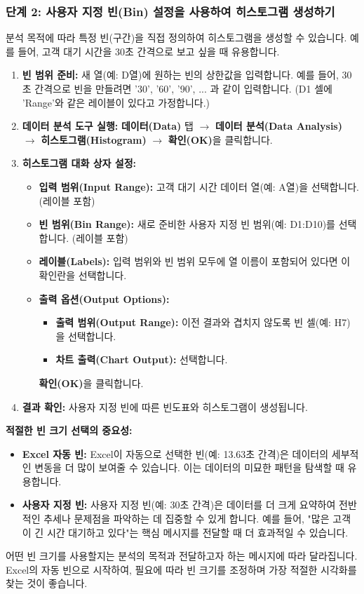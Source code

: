\documentclass[11pt,a4paper]{book}
\theoremstyle{definition}
\begin{document}
\subsubsection*{단계 2: 사용자 지정 빈(Bin) 설정을 사용하여 히스토그램 생성하기}
분석 목적에 따라 특정 빈(구간)을 직접 정의하여 히스토그램을 생성할 수 있습니다. 예를 들어, 고객 대기 시간을 30초 간격으로 보고 싶을 때 유용합니다.

\begin{enumerate}
    \item \textbf{빈 범위 준비:} 새 열(예: D열)에 원하는 빈의 상한값을 입력합니다. 예를 들어, 30초 간격으로 빈을 만들려면 '30', '60', '90', ... 과 같이 입력합니다. (D1 셀에 'Range'와 같은 레이블이 있다고 가정합니다.)
    \item \textbf{데이터 분석 도구 실행:} \textbf{데이터(Data)} 탭 $\rightarrow$ \textbf{데이터 분석(Data Analysis)} $\rightarrow$ \textbf{히스토그램(Histogram)} $\rightarrow$ \textbf{확인(OK)}을 클릭합니다.
    \item \textbf{히스토그램 대화 상자 설정:}
    \begin{itemize}
        \item \textbf{입력 범위(Input Range):} 고객 대기 시간 데이터 열(예: A열)을 선택합니다. (레이블 포함)
        \item \textbf{빈 범위(Bin Range):} 새로 준비한 사용자 지정 빈 범위(예: D1:D10)를 선택합니다. (레이블 포함)
        \item \textbf{레이블(Labels):} 입력 범위와 빈 범위 모두에 열 이름이 포함되어 있다면 이 확인란을 선택합니다.
        \item \textbf{출력 옵션(Output Options):}
        \begin{itemize}
            \item \textbf{출력 범위(Output Range):} 이전 결과와 겹치지 않도록 빈 셀(예: H7)을 선택합니다.
            \item \textbf{차트 출력(Chart Output):} 선택합니다.
        \end{itemize}
        \textbf{확인(OK)}을 클릭합니다.
    \end{itemize}
    \item \textbf{결과 확인:} 사용자 지정 빈에 따른 빈도표와 히스토그램이 생성됩니다.
\end{enumerate}

\begin{tipbox}
\textbf{적절한 빈 크기 선택의 중요성:}
\begin{itemize}
    \item \textbf{Excel 자동 빈:} Excel이 자동으로 선택한 빈(예: 13.63초 간격)은 데이터의 세부적인 변동을 더 많이 보여줄 수 있습니다. 이는 데이터의 미묘한 패턴을 탐색할 때 유용합니다.
    \item \textbf{사용자 지정 빈:} 사용자 지정 빈(예: 30초 간격)은 데이터를 더 크게 요약하여 전반적인 추세나 문제점을 파악하는 데 집중할 수 있게 합니다. 예를 들어, "많은 고객이 긴 시간 대기하고 있다"는 핵심 메시지를 전달할 때 더 효과적일 수 있습니다.
\end{itemize}
어떤 빈 크기를 사용할지는 분석의 목적과 전달하고자 하는 메시지에 따라 달라집니다. Excel의 자동 빈으로 시작하여, 필요에 따라 빈 크기를 조정하며 가장 적절한 시각화를 찾는 것이 좋습니다.
\end{tipbox}
\end{document}
